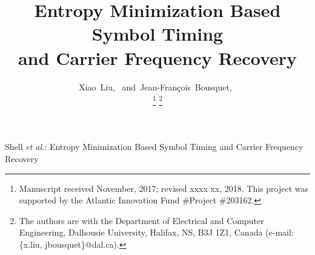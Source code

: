 \documentclass[journal,comsoc,onecolumn, 12pt,draftclsnofoot]{IEEEtran}
\begin{document}
%

\title{Entropy Minimization Based Symbol Timing
\\and Carrier Frequency Recovery}
\author{Xiao~Liu,~
        and~Jean-Fran\c{c}ois~Bousquet,~%

\thanks{Manuscript received November, 2017; revised xxxx xx, 2018. This project was supported by the Atlantic Innovation Fund \#Project \#203162.}
\thanks{The authors are with the Department of Electrical and Computer Engineering, Dalhousie University, Halifax,
NS, B3J 1Z1, Canada (e-mail: \{x.liu, jbousquet\}@dal.ca).}%
}

{Shell \MakeLowercase{\textit{et al.}}: Entropy Minimization Based Symbol Timing and Carrier Frequency Recovery}

\maketitle
\end{document}
